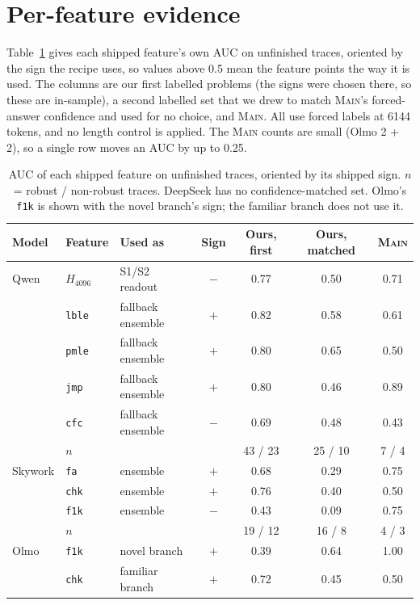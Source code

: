 \documentclass{article}
\newcommand{\sone}{\textsc{S1}}
\newcommand{\stwo}{\textsc{S2}}
\begin{document}
\section{Per-feature evidence}
\label{app:featauc}
Table~\ref{tab:featauc} gives each shipped feature's own AUC on unfinished traces, oriented by the sign the recipe uses, so values above 0.5 mean the feature points the way it is used. The columns are our first labelled problems (the signs were chosen there, so these are in-sample), a second labelled set that we drew to match \textsc{Main}'s forced-answer confidence and used for no choice, and \textsc{Main}. All use forced labels at 6144 tokens, and no length control is applied. The \textsc{Main} counts are small (Olmo 2 + 2), so a single row moves an AUC by up to 0.25.
\begin{table}[h]
\centering\small
\caption{AUC of each shipped feature on unfinished traces, oriented by its shipped sign. $n$ = robust / non-robust traces. DeepSeek has no confidence-matched set. Olmo's \texttt{f1k} is shown with the novel branch's sign; the familiar branch does not use it.}
\label{tab:featauc}
\begin{tabular}{lllcccc}
\toprule
Model & Feature & Used as & Sign & Ours, first & Ours, matched & \textsc{Main} \\
\midrule
Qwen & $H_{4096}$ & \sone{}/\stwo{} readout & $-$ & 0.77 & 0.50 & 0.71 \\
 & \texttt{lble} & fallback ensemble & $+$ & 0.82 & 0.58 & 0.61 \\
 & \texttt{pmle} & fallback ensemble & $+$ & 0.80 & 0.65 & 0.50 \\
 & \texttt{jmp} & fallback ensemble & $+$ & 0.80 & 0.46 & 0.89 \\
 & \texttt{cfc} & fallback ensemble & $-$ & 0.69 & 0.48 & 0.43 \\
 & \multicolumn{3}{l}{\quad $n$} & 43 / 23 & 25 / 10 & 7 / 4 \\
\midrule
Skywork & \texttt{fa} & ensemble & $+$ & 0.68 & 0.29 & 0.75 \\
 & \texttt{chk} & ensemble & $+$ & 0.76 & 0.40 & 0.50 \\
 & \texttt{f1k} & ensemble & $-$ & 0.43 & 0.09 & 0.75 \\
 & \multicolumn{3}{l}{\quad $n$} & 19 / 12 & 16 / 8 & 4 / 3 \\
\midrule
Olmo & \texttt{f1k} & novel branch & $+$ & 0.39 & 0.64 & 1.00 \\
 & \texttt{chk} & familiar branch & $+$ & 0.72 & 0.45 & 0.50 \\

\end{tabular}
\end{table}
\end{document}
